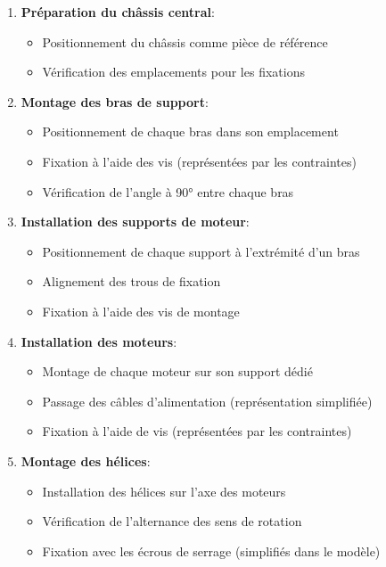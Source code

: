 \documentclass[a4paper,12pt]{report}
\begin{document}
\begin{enumerate}
    \item \textbf{Préparation du châssis central}:
    \begin{itemize}
        \item Positionnement du châssis comme pièce de référence
        \item Vérification des emplacements pour les fixations
    \end{itemize}
    
    \item \textbf{Montage des bras de support}:
    \begin{itemize}
        \item Positionnement de chaque bras dans son emplacement
        \item Fixation à l'aide des vis (représentées par les contraintes)
        \item Vérification de l'angle à 90° entre chaque bras
    \end{itemize}
    
    \item \textbf{Installation des supports de moteur}:
    \begin{itemize}
        \item Positionnement de chaque support à l'extrémité d'un bras
        \item Alignement des trous de fixation
        \item Fixation à l'aide des vis de montage
    \end{itemize}
    
    \item \textbf{Installation des moteurs}:
    \begin{itemize}
        \item Montage de chaque moteur sur son support dédié
        \item Passage des câbles d'alimentation (représentation simplifiée)
        \item Fixation à l'aide de vis (représentées par les contraintes)
    \end{itemize}
    
    \item \textbf{Montage des hélices}:
    \begin{itemize}
        \item Installation des hélices sur l'axe des moteurs
        \item Vérification de l'alternance des sens de rotation
        \item Fixation avec les écrous de serrage (simplifiés dans le modèle)
    \end{itemize}
    

\end{enumerate}
\end{document}
